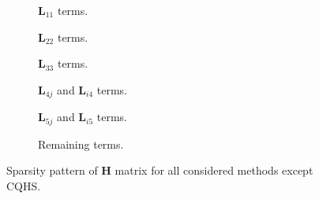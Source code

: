 \begin{figure}[ht]

\centering

\begin{subfigure}{0.33\textwidth}
\centering
\begin{minipage}{1\textwidth}

\end{minipage}
\caption{$\bm{L}_{11}$ terms.}
\label{fig:L11}
\end{subfigure}%
\begin{subfigure}{0.33\textwidth}
\centering
\begin{minipage}{1\textwidth}

\end{minipage}
\caption{$\bm{L}_{22}$ terms.}
\label{fig:L22}
\end{subfigure}%
\begin{subfigure}{0.33\textwidth}
\centering
\begin{minipage}{1\textwidth}

\end{minipage}
\caption{$\bm{L}_{33}$ terms.}
\label{fig:L33}
\end{subfigure}%

\begin{subfigure}{0.33\textwidth}
\centering
\begin{minipage}{1\textwidth}

\end{minipage}
\caption{$\bm{L}_{4j}$ and $\bm{L}_{i4}$ terms.}
\label{fig:L4j}
\end{subfigure}%
\begin{subfigure}{0.33\textwidth}
\centering
\begin{minipage}{1\textwidth}

\end{minipage}
\caption{$\bm{L}_{5j}$ and $\bm{L}_{i5}$ terms.}
\end{subfigure}%
\begin{subfigure}{0.33\textwidth}
\centering
\begin{minipage}{1\textwidth}

\end{minipage}
\caption{Remaining terms.}
\end{subfigure}%

\caption{Sparsity pattern of $\mathbf{H}$ matrix for all considered methods except CQHS.}
\label{fig:figsparsityHSS}
\end{figure}




